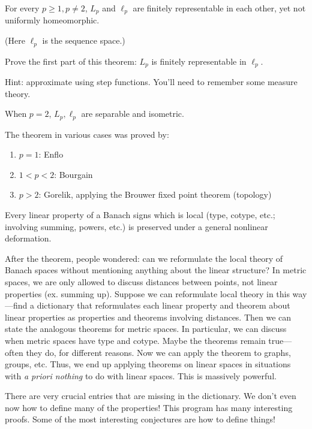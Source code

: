 \begin{thm}
For every $p\ge 1,p\ne2$, $L_p$ and $\ell_p$ are finitely representable in each other, yet not uniformly homeomorphic.
\end{thm}
(Here $\ell_p$ is the sequence space.)

\begin{exr}
Prove the first part of this theorem: $L_p$ is finitely representable in $\ell_p$.
\end{exr}
Hint: approximate using step functions. You'll need to remember some measure theory.

When $p=2$, $L_p,\ell_p$ are separable and isometric.

The theorem in various cases was proved by:
\begin{enumerate}
\item
$p=1$: Enflo
\item
$1<p<2$: Bourgain
\item
$p>2$: Gorelik, applying the Brouwer fixed point theorem (topology)
\end{enumerate}

Every linear property of a Banach signs which is local (type, cotype, etc.; involving summing, powers, etc.) is preserved under a general nonlinear deformation.

After the theorem, people wondered: can we reformulate the local theory of Banach spaces without mentioning anything about the linear structure? 
In metric spaces, we are only allowed to discuss distances between points, not linear properties (ex. summing up). Suppose we can reformulate local theory in this way---find a dictionary that reformulates each linear property and theorem about linear properties as properties and theorems involving distances. Then we can state the analogous theorems for metric spaces. In particular, we can discuss when metric spaces have type and cotype. Maybe the theorems remain true---often they do, for different reasons. Now we can apply the theorem to graphs, groups, etc. %
Thus, we end up applying theorems on linear spaces in situations with \emph{a priori nothing} to do with linear spaces. This is massively powerful.

There are very crucial entries that are missing in the dictionary. We don't even now how to define many of the properties! %
This program has many interesting proofs. Some of the most interesting conjectures are how to define things!

